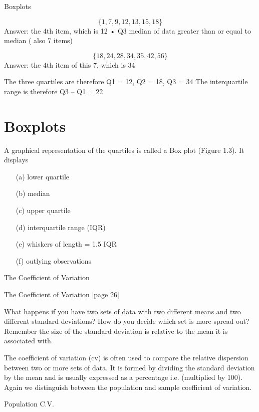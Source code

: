 \documentclass[]{report}
\begin{document}
{Boxplots}

\[\{1,	7 , 9 ,12 ,13, 15, 18\}\] 
Answer: the 4th item, which is 12
•	Q3  median of data greater than or equal to median ( also 7 items)



\[\{18, 24, 28, 34, 35, 42, 56\} \]
Answer: the 4th item of this 7, which is 34

The three quartiles are therefore Q1 = 12, Q2 = 18, Q3 = 34
The interquartile range is therefore Q3 – Q1 = 22


\section{Boxplots}

A graphical representation of the quartiles is called a Box plot (Figure 1.3). 
It displays 
\begin{itemize}
	\item[(a)] lower quartile 
	\item[(b)] median 
	\item[(c)] upper quartile  
	\item[(d)] interquartile range (IQR)  
	\item[(e)] whiskers of length = 1.5 IQR   
	\item[(f)] outlying observations
\end{itemize}


{The Coefficient of Variation }

The Coefficient of Variation 	[page 26]

What happens if you have two sets of data with two different means and two different standard deviations? How do you decide which set is more spread out? Remember the size of the standard deviation is relative to the mean it is associated with.

The coefficient of variation (cv) is often used to compare the relative dispersion between two or more sets of data. It is formed by dividing the standard deviation by the mean and is usually expressed as a percentage i.e. (multiplied by 100). Again we distinguish between the population and sample coefficient of variation.


{Population C.V.}
\end{document}
